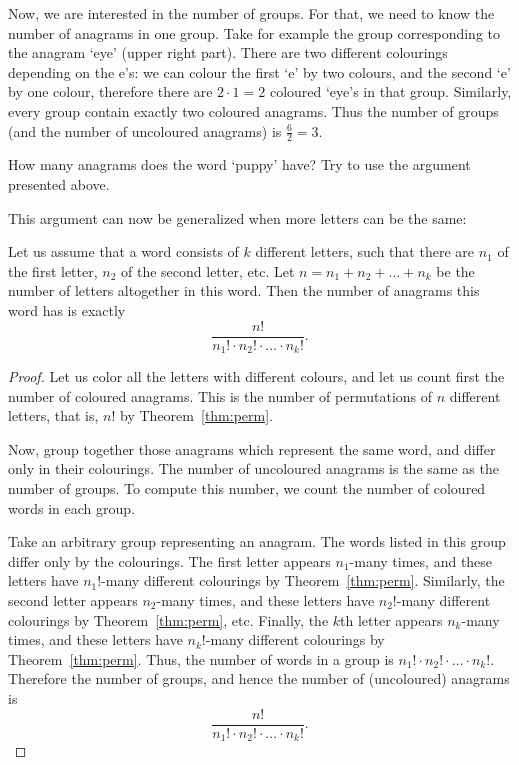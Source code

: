 Now, we are interested in the number of groups. 
For that, we need to know the number of anagrams in one group. 
Take for example the group corresponding to the anagram `eye' (upper right part). 
There are two different colourings depending on the e's: 
we can colour the first `e' by two colours, 
and the second `e' by one colour, 
therefore there are $2 \cdot 1 = 2$ coloured `eye's in that group. 
Similarly, every group contain exactly two coloured anagrams. 
Thus the number of groups (and the number of uncoloured anagrams) is $\frac62 = 3$. 

\begin{exercise}\label{ex:puppy}
How many anagrams does the word `puppy' have? 
Try to use the argument presented above. 
\end{exercise}

This argument can now be generalized when more letters can be the same: 

\begin{theorem}\label{thm:permrepetition}
Let us assume that a word consists of $k$ different letters, 
such that there are $n_1$ of the first letter, $n_2$ of the second letter, etc. 
Let $n = n_1 + n_2 + \dots + n_k$ be the number of letters altogether in this word. 
Then the number of anagrams this word has is exactly 
\[
\frac{n!}{n_1! \cdot n_2! \cdot \dots \cdot n_k!}. 
\]
\end{theorem}

\begin{proof}
Let us color all the letters with different colours, 
and let us count first the number of coloured anagrams. 
This is the number of permutations of $n$ different letters, 
that is, $n!$ by Theorem~\ref{thm:perm}. 

Now, group together those anagrams which represent the same word, 
and differ only in their colourings. 
The number of uncoloured anagrams is the same as the number of groups. 
To compute this number, 
we count the number of coloured words in each group. 

Take an arbitrary group representing an anagram. 
The words listed in this group differ only by the colourings. 
The first letter appears $n_1$-many times, 
and these letters have $n_1!$-many different colourings by Theorem~\ref{thm:perm}. 
Similarly, the second letter appears $n_2$-many times, 
and these letters have $n_2!$-many different colourings by Theorem~\ref{thm:perm}, etc. 
Finally, the $k$th letter appears $n_k$-many times, 
and these letters have $n_k!$-many different colourings by Theorem~\ref{thm:perm}. 
Thus, 
the number of words in a group is $n_1! \cdot n_2! \cdot \dots \cdot n_k!$. 
Therefore the number of groups, 
and hence the number of (uncoloured) anagrams is 
\[
\frac{n!}{n_1! \cdot n_2! \cdot \dots \cdot n_k!}. 
\]
\end{proof}

